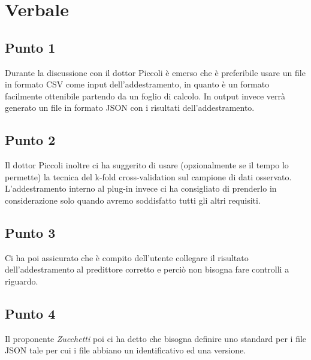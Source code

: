 \section{Verbale}
        \subsection{Punto 1}
            Durante la discussione con il dottor Piccoli è emerso che è preferibile usare un file in formato CSV come input dell'addestramento, in quanto è un formato facilmente ottenibile partendo da un foglio di calcolo. In output invece verrà generato un file in formato JSON con i risultati dell'addestramento.
        \subsection{Punto 2}
            Il dottor Piccoli inoltre ci ha suggerito di usare (opzionalmente se il tempo lo permette) la tecnica del k-fold cross-validation sul campione di dati osservato. L'addestramento interno al plug-in invece ci ha consigliato di prenderlo in considerazione solo quando avremo soddisfatto tutti gli altri requisiti.
        \subsection{Punto 3}
            Ci ha poi assicurato che è compito dell'utente collegare il risultato dell'addestramento al predittore corretto e perciò non bisogna fare controlli a riguardo.
        \subsection{Punto 4}
            Il proponente \textit{Zucchetti} poi ci ha detto che bisogna definire uno standard per i file JSON tale per cui i file abbiano un identificativo ed una versione.